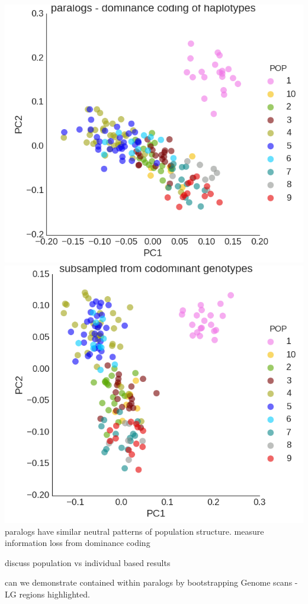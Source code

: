 \documentclass[12pt,  one column]{article}
\begin{document}
\includegraphics[scale=.3]{figures/PCA_dom_paralogs.png}
\includegraphics[scale=.3]{figures/PCA_codom_subsample.png}
paralogs have similar neutral patterns of population structure.
measure information loss from dominance coding

discuss population vs individual based results

can we demonstrate contained within paralogs by bootstrapping 
Genome scans - LG regions highlighted.
\end{document}
